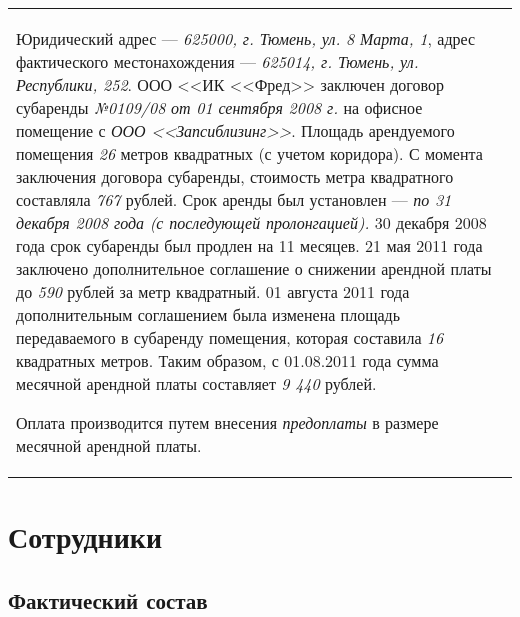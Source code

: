 \documentclass[a4paper,12pt]{scrreprt}
\begin{document}
\begin{tabular}{|p{}} 
Юридический адрес --- \emph{625000, г. Тюмень, ул. 8 Марта, 1}, адрес фактического местонахождения --- \emph{625014, г. Тюмень, ул. Республики, 252}.
ООО <<ИК <<Фред>> заключен договор субаренды \emph{№0109/08 от 01 сентября 2008 г.} на офисное помещение с \emph{ООО <<Запсиблизинг>>}. Площадь арендуемого помещения \emph{26} метров квадратных (с учетом коридора). С момента заключения договора субаренды, стоимость метра квадратного составляла \emph{767} рублей. Срок аренды был установлен --- \emph{по 31 декабря 2008 года (с последующей пролонгацией).} 
30 декабря 2008 года срок субаренды был продлен на 11 месяцев. 21 мая 2011 года заключено дополнительное соглашение о снижении арендной платы до \emph{590} рублей за метр квадратный. 01 августа 2011 года дополнительным соглашением была изменена площадь передаваемого в субаренду помещения, которая составила \emph{16} квадратных метров. Таким образом, с 01.08.2011 года сумма месячной арендной платы составляет \emph{9 440} рублей.

Оплата производится путем внесения \emph{предоплаты} в размере месячной арендной платы.


\end{tabular}

\pagebreak

\section{Сотрудники}

\subsection{Фактический состав}
\end{document}
